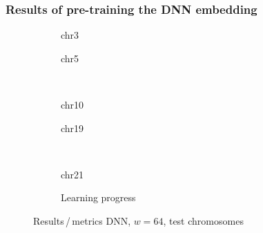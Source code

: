 \subsubsection{Results of pre-training the DNN embedding} \label{sec:appendix:pretraining_results}
\begin{figure}[h!] %
    \begin{subfigure}{0.45\textwidth}
        \scriptsize
        \caption{chr3}
    \end{subfigure} \hfill
    \begin{subfigure}{0.45\textwidth}
        \scriptsize
        \caption{chr5}
    \end{subfigure}\\[5mm]
    \begin{subfigure}{0.45\textwidth}
        \scriptsize
        \caption{chr10}
    \end{subfigure}\hfill
    \begin{subfigure}{0.45\textwidth}
        \scriptsize
        \caption{chr19}
    \end{subfigure}\\[3mm]
    \centering
    \begin{subfigure}{0.45\textwidth}
        \scriptsize
        \caption{chr21}
    \end{subfigure} \hfill
    \begin{subfigure}{0.45\textwidth}
        \scriptsize
        \caption{Learning progress} \label{fig:results:DNN64_lossEpochs}
    \end{subfigure}
    \caption{Results\,/\,metrics DNN, $w=64$, test chromosomes}   \label{fig:results:DNN64_pearson}
\end{figure}
